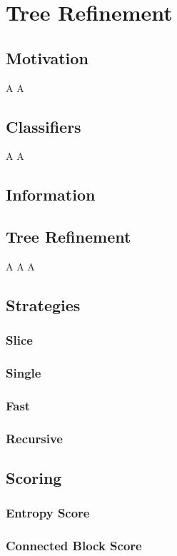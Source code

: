 \chapter{Tree Refinement}
\label{chap:tree}

	\clearpage
	
	\section{Motivation}
	
		A\clearpage
		A\clearpage
	
	\section{Classifiers}
	
		A\clearpage
		A\clearpage

	\section{Information}
	
		\clearpage

	\section{Tree Refinement}
	
		\clearpage
		A\clearpage
		A\clearpage
		A\clearpage
		
	\section{Strategies}
	
		\subsection{Slice}
			\clearpage
		
		\subsection{Single}
			\clearpage
		
		\subsection{Fast}
			\clearpage
		
		\subsection{Recursive}
			\clearpage
	
	\section{Scoring}
	
		\subsection{Entropy Score}
		
			\clearpage
		
		\subsection{Connected Block Score}
		
			\clearpage
